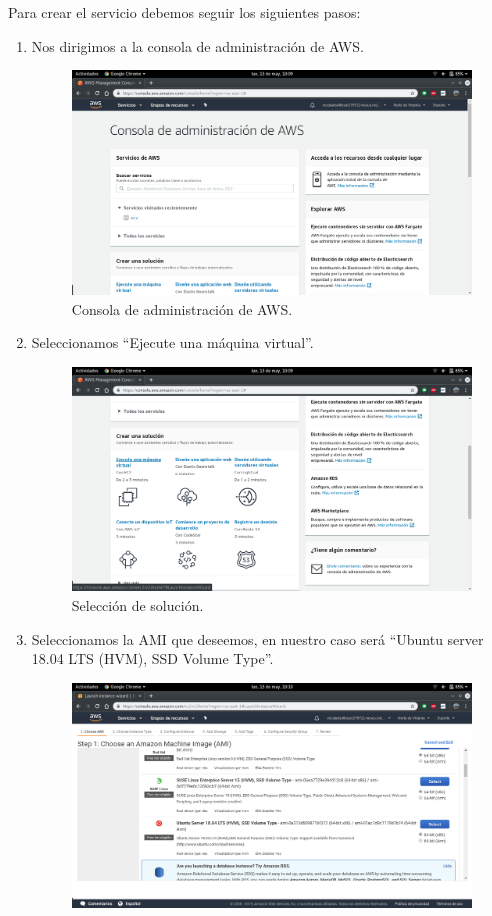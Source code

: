 Para crear el servicio debemos seguir los siguientes pasos:
\newpage
\begin{enumerate}
	\item Nos dirigimos a la consola de administración de AWS.
	\begin{figure}[h]
		\centering
		\includegraphics[scale=0.28]{ImagenesAWS/MV/1.png}
		\caption{Consola de administración de AWS.}
		\label{Consola de administración de AWS}
	\end{figure}
	\item Seleccionamos ``Ejecute una máquina virtual''.
	\begin{figure}[h]
		\centering
		\includegraphics[scale=0.28]{ImagenesAWS/MV/3.png}
		\caption{Selección de solución.}
		\label{Selección de solución}
	\end{figure}
\newpage
	\item Seleccionamos la AMI que deseemos, en nuestro caso será ``Ubuntu server 18.04 LTS (HVM), SSD Volume Type''.
	\begin{figure}[h]
		\centering
		\includegraphics[scale=0.28]{ImagenesAWS/MV/5.png}

\end{figure}
\end{enumerate}
